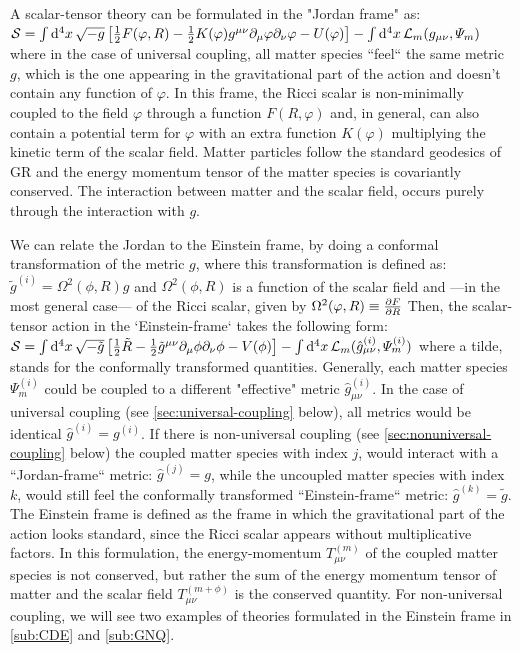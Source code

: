 A scalar-tensor theory can be formulated in the "Jordan frame" as:
\beeqc$\label{eq:jordan-frame-action}
\mathcal{S} = \int \mathrm{d}^{4} {x} \, \sqrt{-g} \left[  \frac{1}{2} F(\varphi, R) - \frac{1}{2} K(\varphi) g^{\mu \nu}  \partial_{\mu}\varphi \partial_{\nu}\varphi 
- U(\varphi)    \right] - \int \mathrm{d}^{4} {x} \, \mathcal{L}_m (g_{\mu \nu} , \varPsi_m )
$
where in the case of universal coupling, all matter species ``feel`` the same metric $g$, which is the one
appearing in the gravitational 
part of the action and doesn't contain any function of $\varphi$.
In this frame, the Ricci scalar is non-minimally coupled to the field $\varphi$ through a function $F(R, \varphi)$ and, in general, 
can also contain a potential term for $\varphi$ with an extra function $K(\varphi)$ multiplying the kinetic term of the scalar field.
Matter particles follow the standard geodesics of GR and the energy momentum tensor of the matter species is covariantly conserved.
The interaction between matter and the scalar field, occurs purely through the interaction with $g$.

We can relate the Jordan to the Einstein frame, by doing a conformal transformation of the metric $g$, where
this transformation is defined as:
\beeqc$
\tilde{g}^{(i)} = \Omega^2(\phi, R) g
$
and $\Omega^2(\phi, R)$ is a function of the scalar field and ---in the most general case--- of the Ricci scalar, given by
\beeqp$
\Omega^2(\varphi,R) \equiv \frac{\partial{F}}{\partial{R}} 
$
Then, the scalar-tensor action in the `Einstein-frame` takes the following form:
\beeqc$\label{eq:einstein-frame-action}
\mathcal{S} = \int \mathrm{d}^{4} {x} \, \sqrt{-\tilde{g}} \left[  \frac{1}{2} \tilde{R} - \frac{1}{2} \tilde{g}^{\mu \nu}  \partial_{\mu}\phi \partial_{\nu}\phi 
- V(\phi)    \right] - \int \mathrm{d}^{4} {x} \, \mathcal{L}_m (\hat{g}^{(i)}_{\mu \nu} , \varPsi_m^{(i)} )
$
where a tilde, stands for the conformally transformed quantities.
Generally, each matter species $\varPsi_m^{(i)}$ could be coupled to a different "effective" metric $\hat{g}^{(i)}_{\mu \nu}$.
In the case of universal coupling (see \cref{sec:universal-coupling} below), all metrics would be identical $\hat{g}^{(i)} = g^{(i)}$. 
If there is non-universal coupling (see \cref{sec:nonuniversal-coupling} below) the coupled matter species with index $j$,
would interact with a ``Jordan-frame`` metric: $\hat{g}^{(j)} = g$, while the uncoupled matter species with index $k$, would still  
feel the conformally transformed ``Einstein-frame`` metric:  $\hat{g}^{(k)}=\tilde g$. The Einstein frame is defined as the 
frame in which the gravitational part of the action looks standard, since the Ricci scalar appears without multiplicative factors.
In this formulation, the energy-momentum $T^{(m)}_{\mu \nu}$ of the coupled matter species is not conserved, but rather
the sum of the energy momentum tensor of matter and the scalar field $T^{(m+\phi)}_{\mu \nu}$ is the conserved quantity.
For non-universal coupling, we will see two examples of theories formulated in the Einstein frame in \cref{sub:CDE} and \cref{sub:GNQ}.

